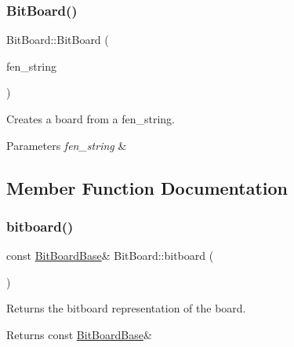 \subsubsection{\texorpdfstring{Bit\+Board()}{BitBoard()}\hspace{0.1cm}{\footnotesize\ttfamily [2/2]}}
{\footnotesize\ttfamily Bit\+Board\+::\+Bit\+Board (\begin{DoxyParamCaption}\item[{const std\+::string \&}]{fen\+\_\+string }\end{DoxyParamCaption})\hspace{0.3cm}{\ttfamily [inline]}}



Creates a board from a fen\+\_\+string. 


\begin{DoxyParams}{Parameters}
{\em fen\+\_\+string} & \\
\hline
\end{DoxyParams}


\subsection{Member Function Documentation}
\mbox{\label{classBitBoard_ac8a51ff161d0271a81362c179465db69}} 
\subsubsection{\texorpdfstring{bitboard()}{bitboard()}}
{\footnotesize\ttfamily const \hyperlink{structBitBoardBase}{Bit\+Board\+Base}\& Bit\+Board\+::bitboard (\begin{DoxyParamCaption}{ }\end{DoxyParamCaption})\hspace{0.3cm}{\ttfamily [inline]}}



Returns the bitboard representation of the board. 

\begin{DoxyReturn}{Returns}
const \hyperlink{structBitBoardBase}{Bit\+Board\+Base}\& 
\end{DoxyReturn}
\mbox{\label{classBitBoard_a5d5b2eea456fee2ce5246e1354fc4307}} 
